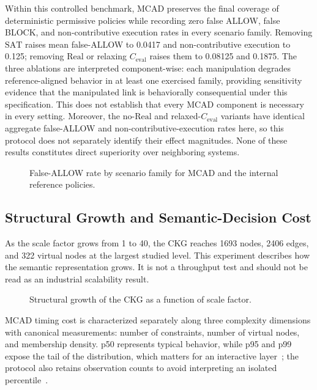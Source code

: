 \documentclass[journal]{IEEEtran}
\begin{document}
Within this controlled benchmark, MCAD preserves the final coverage of deterministic permissive policies while recording zero false ALLOW, false BLOCK, and non-contributive execution rates in every scenario family. Removing $\mathrm{SAT}$ raises mean false-ALLOW to 0.0417 and non-contributive execution to 0.125; removing $\mathrm{Real}$ or relaxing $C_{\mathrm{eval}}$ raises them to 0.08125 and 0.1875. The three ablations are interpreted component-wise: each manipulation degrades reference-aligned behavior in at least one exercised family, providing sensitivity evidence that the manipulated link is behaviorally consequential under this specification. This does not establish that every MCAD component is necessary in every setting. Moreover, the no-$\mathrm{Real}$ and relaxed-$C_{\mathrm{eval}}$ variants have identical aggregate false-ALLOW and non-contributive-execution rates here, so this protocol does not separately identify their effect magnitudes. None of these results constitutes direct superiority over neighboring systems.

\begin{figure}[!tb]
\centering

\caption{False-ALLOW rate by scenario family for MCAD and the internal reference policies.}
\label{fig:robustness-false-allow}
\end{figure}

\subsection{Structural Growth and Semantic-Decision Cost}

As the scale factor grows from 1 to 40, the CKG reaches 1693 nodes, 2406 edges, and 322 virtual nodes at the largest studied level. This experiment describes how the semantic representation grows. It is not a throughput test and should not be read as an industrial scalability result.



\begin{figure}[!tb]
\centering

\caption{Structural growth of the CKG as a function of scale factor.}
\label{fig:scalability}
\end{figure}

MCAD timing cost is characterized separately along three complexity dimensions with canonical measurements: number of constraints, number of virtual nodes, and membership density. p50 represents typical behavior, while p95 and p99 expose the tail of the distribution, which matters for an interactive layer~\cite{DeanBarroso2013}; the protocol also retains observation counts to avoid interpreting an isolated percentile~\cite{KaliberaJones2013}.
\end{document}
